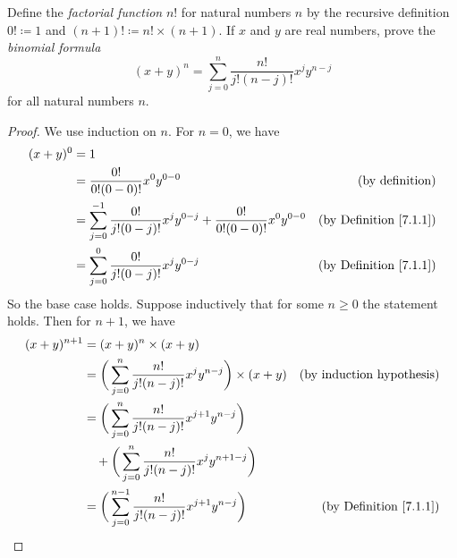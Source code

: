 \begin{exercise}\label{ex 7.1.4}
    Define the \emph{factorial function} \(n!\) for natural numbers \(n\) by the recursive definition \(0! \coloneqq 1\) and \((n + 1)! \coloneqq n! \times (n + 1)\).
    If \(x\) and \(y\) are real numbers, prove the \emph{binomial formula}
    \[
        (x + y)^n = \sum_{j = 0}^n \frac{n!}{j!(n - j)!} x^j y^{n - j}
    \]
    for all natural numbers \(n\).
\end{exercise}

\begin{proof}
    We use induction on \(n\).
    For \(n = 0\), we have
    \begin{align*}
        (x + y)^0 & = 1                                                                                                                                \\
                  & = \frac{0!}{0!(0 - 0)!} x^0 y^{0 - 0}                                                         & \text{(by definition)}             \\
                  & = \sum_{j = 0}^{-1} \frac{0!}{j!(0 - j)!} x^j y^{0 - j} + \frac{0!}{0!(0 - 0)!} x^0 y^{0 - 0} & \text{(by Definition \ref{7.1.1})} \\
                  & = \sum_{j = 0}^0 \frac{0!}{j!(0 - j)!} x^j y^{0 - j}                                          & \text{(by Definition \ref{7.1.1})}
    \end{align*}
    So the base case holds.
    Suppose inductively that for some \(n \geq 0\) the statement holds.
    Then for \(n + 1\), we have
    \begin{align*}
        (x + y)^{n + 1} & = (x + y)^n \times (x + y)                                                                                                      \\
                        & = \bigg(\sum_{j = 0}^n \frac{n!}{j!(n - j)!} x^j y^{n - j}\bigg) \times (x + y)            & \text{(by induction hypothesis)}   \\
                        & = \bigg(\sum_{j = 0}^n \frac{n!}{j!(n - j)!} x^{j + 1} y^{n - j}\bigg)                                                          \\
                        & \quad + \bigg(\sum_{j = 0}^n \frac{n!}{j!(n - j)!} x^j y^{n + 1 - j}\bigg)                                                      \\
                        & = \bigg(\sum_{j = 0}^{n - 1} \frac{n!}{j!(n - j)!} x^{j + 1} y^{n - j}\bigg)               & \text{(by Definition \ref{7.1.1})} \\

\end{align*}
\end{proof}
